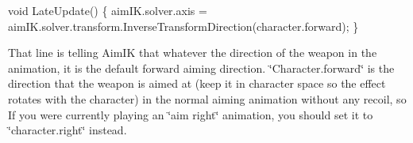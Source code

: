 \begin{DoxyCode}
\textcolor{keywordtype}{void} LateUpdate() \{
        aimIK.solver.axis = aimIK.solver.transform.InverseTransformDirection(character.forward);
\}
\end{DoxyCode}


That line is telling Aim\+IK that whatever the direction of the weapon in the animation, it is the default forward aiming direction. \char`\"{}\+Character.\+forward\char`\"{} is the direction that the weapon is aimed at (keep it in character space so the effect rotates with the character) in the normal aiming animation without any recoil, so If you were currently playing an \char`\"{}aim right\char`\"{} animation, you should set it to \char`\"{}character.\+right\char`\"{} instead. 
